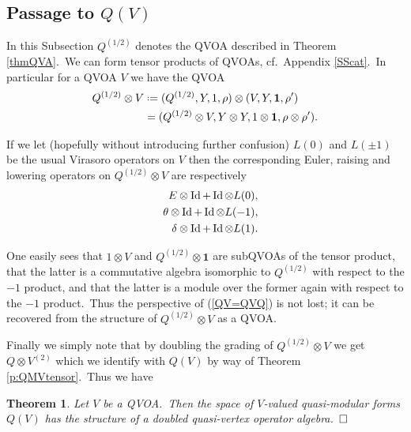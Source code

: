 \documentclass[12pt]{amsart}
\theoremstyle{plain}
\newtheorem{thm}{Theorem}[section]
\theoremstyle{definition}
\theoremstyle{remark}
\newcommand*{\df}{\mathrel{\vcenter{\baselineskip0.5ex \lineskiplimit0pt
                     \hbox{\scriptsize.}\hbox{\scriptsize.}}} =}
\DeclareMathOperator{\Id}{Id}
\begin{document}
\subsection{Passage to \texorpdfstring{$Q(V)$}{Q(V)}} In this Subsection $Q^{(1/2)}$ denotes the QVOA
described in Theorem \ref{thmQVA}.\ We can form tensor products of QVOAs, cf.\ Appendix \ref{SScat}.\ In particular for a QVOA $V$ we have the QVOA
\begin{align}
\label{QVOATP}
  Q^{(1/2)}\otimes V  &\df (Q^{(1/2)}, Y, 1, \rho)\otimes (V, Y, \mathbf{1}, \rho')\notag\\
  &=(Q^{(1/2)}\otimes V, Y\otimes Y, 1\otimes\mathbf{1}, \rho\otimes\rho').
\end{align}

If we let (hopefully without introducing further confusion) $L(0)$ and $L(\pm 1)$ be the usual Virasoro operators on $V$ then the corresponding Euler, raising and lowering operators on $Q^{(1/2)}\otimes V$ are respectively
\begin{eqnarray}\label{sl2ops}
 && E\otimes \Id + \Id\otimes L(0), \notag \\
 && \theta\otimes \Id + \Id\otimes L(-1),\\
 &&\delta\otimes \Id + \Id\otimes L(1).\notag
\end{eqnarray}

One easily sees that $1\otimes V$ and $Q^{(1/2)}\otimes \mathbf{1}$ are subQVOAs of the tensor product, that the latter is a commutative algebra isomorphic to $Q^{(1/2)}$ with respect to the $-1$ product, and that the latter is a module over the former again with respect to the $-1$ product.\ Thus the perspective of (\ref{QV=QVQ}) is not lost; it can be recovered from the structure of $Q^{(1/2)}\otimes V$ as a QVOA.

\medskip
Finally we simply note that by doubling the grading of $Q^{(1/2)}\otimes V$ we get $Q\otimes V^{(2)}$  which we identify with $Q(V)$ by way of Theorem \ref{p:QMVtensor}.\ Thus we have
\begin{thm}
Let $V$ be a QVOA.\ Then the space
of $V$-valued quasi-modular forms $Q(V)$
has the structure of a doubled quasi-vertex operator algebra.\ $\hfill\Box$
\end{thm}

\iffalse
\end{document}
